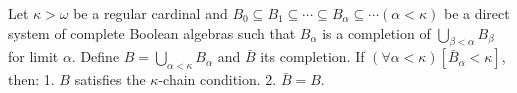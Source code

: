 Let $\kappa > \omega$ be a regular cardinal and $B_0 \subseteq B_1 \subseteq \cdots \subseteq B_\alpha \subseteq \cdots (\alpha < \kappa)$ be a direct system of complete Boolean algebras such that $B_\alpha$ is a completion of $\bigcup_{\beta < \alpha} B_\beta$ for limit $\alpha$. Define $B = \bigcup_{\alpha < \kappa} B_\alpha$ and $\bar{B}$ its completion. If $(\forall \alpha < \kappa)[\bar{B}_\alpha < \kappa]$, then:
1. $B$ satisfies the $\kappa$-chain condition.
2. $\bar{B} = B$.
